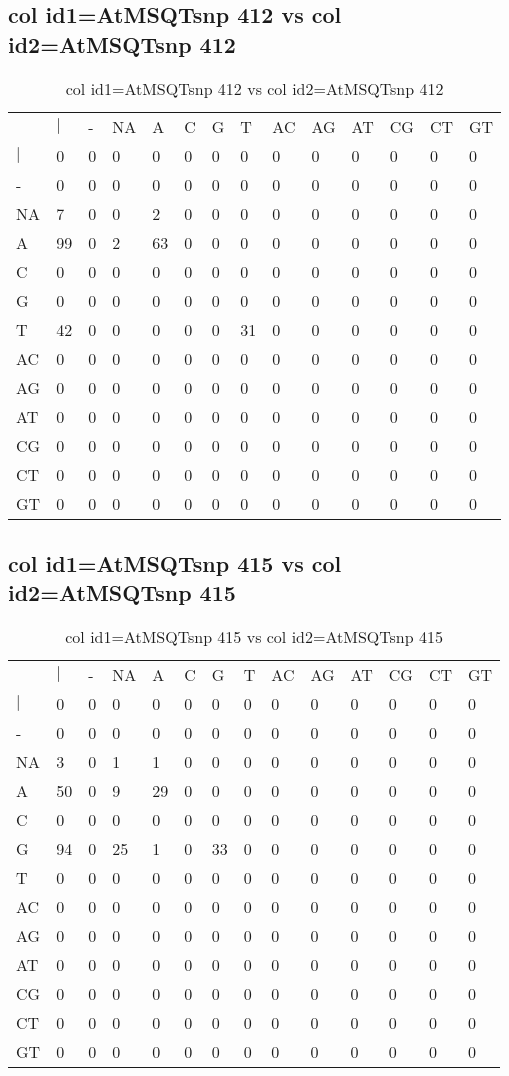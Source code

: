 \subsection{col id1=AtMSQTsnp 412 vs col id2=AtMSQTsnp 412}
\begin{center}
\begin{longtable}{|l|l|l|l|l|l|l|l|l|l|l|l|l|l|}
\caption{col id1=AtMSQTsnp 412 vs col id2=AtMSQTsnp 412} \label{table_dm738}\\
\hline
\\
\hline
&$|$&-&NA&A&C&G&T&AC&AG&AT&CG&CT&GT\\
$|$&0&0&0&0&0&0&0&0&0&0&0&0&0\\
-&0&0&0&0&0&0&0&0&0&0&0&0&0\\
NA&7&0&0&2&0&0&0&0&0&0&0&0&0\\
A&99&0&2&63&0&0&0&0&0&0&0&0&0\\
C&0&0&0&0&0&0&0&0&0&0&0&0&0\\
G&0&0&0&0&0&0&0&0&0&0&0&0&0\\
T&42&0&0&0&0&0&31&0&0&0&0&0&0\\
AC&0&0&0&0&0&0&0&0&0&0&0&0&0\\
AG&0&0&0&0&0&0&0&0&0&0&0&0&0\\
AT&0&0&0&0&0&0&0&0&0&0&0&0&0\\
CG&0&0&0&0&0&0&0&0&0&0&0&0&0\\
CT&0&0&0&0&0&0&0&0&0&0&0&0&0\\
GT&0&0&0&0&0&0&0&0&0&0&0&0&0\\
\hline
\end{longtable}
\end{center}

\subsection{col id1=AtMSQTsnp 415 vs col id2=AtMSQTsnp 415}
\begin{center}
\begin{longtable}{|l|l|l|l|l|l|l|l|l|l|l|l|l|l|}
\caption{col id1=AtMSQTsnp 415 vs col id2=AtMSQTsnp 415} \label{table_dm740}\\
\hline
\\
\hline
&$|$&-&NA&A&C&G&T&AC&AG&AT&CG&CT&GT\\
$|$&0&0&0&0&0&0&0&0&0&0&0&0&0\\
-&0&0&0&0&0&0&0&0&0&0&0&0&0\\
NA&3&0&1&1&0&0&0&0&0&0&0&0&0\\
A&50&0&9&29&0&0&0&0&0&0&0&0&0\\
C&0&0&0&0&0&0&0&0&0&0&0&0&0\\
G&94&0&25&1&0&33&0&0&0&0&0&0&0\\
T&0&0&0&0&0&0&0&0&0&0&0&0&0\\
AC&0&0&0&0&0&0&0&0&0&0&0&0&0\\
AG&0&0&0&0&0&0&0&0&0&0&0&0&0\\
AT&0&0&0&0&0&0&0&0&0&0&0&0&0\\
CG&0&0&0&0&0&0&0&0&0&0&0&0&0\\
CT&0&0&0&0&0&0&0&0&0&0&0&0&0\\
GT&0&0&0&0&0&0&0&0&0&0&0&0&0\\
\hline
\end{longtable}
\end{center}

